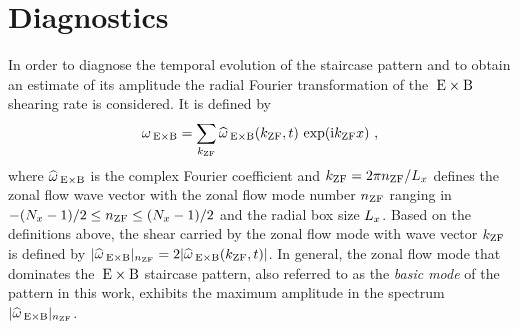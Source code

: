 \newpage
\section{Diagnostics}
\label{sec:diagnostics}

In order to diagnose the temporal evolution of the staircase pattern and to obtain an estimate of its amplitude the radial Fourier transformation of the $\mathrm{\:E}\times\mathrm{B}$ shearing rate is considered. 
It is defined by
\begin{equation}
	\omega_{\mathrm{\:E \times B}} = \sum_{k_\mathrm{ZF}} \widehat{\omega}_{\mathrm{\:E \times B}}(k_\mathrm{ZF},t) \, \exp(\mathrm{i} k_\mathrm{ZF} x)~,
	\label{eq:shearingrate_fourier}
\end{equation}
where $\widehat{\omega}_{\mathrm{\:E \times B}}$ is the complex Fourier coefficient and $k_\mathrm{ZF} = 2\pi n_\mathrm{ZF}/L_x$
defines the zonal flow wave vector with the zonal flow mode number $n_\mathrm{ZF}$ ranging in $-(N_x -1)/2 \leq n_\mathrm{ZF} \leq (N_x -1)/2 $ and the radial box size $L_x$.
Based on the definitions above, the shear carried by the zonal flow mode with wave vector $k_\mathrm{ZF}$ is defined by $|\widehat{\omega}_{\mathrm{\:E \times B}}|_{n_\mathrm{ZF}} = 2 |\widehat{\omega}_{\mathrm{\:E \times B}}(k_\mathrm{ZF},t)|$. 
In general, the zonal flow mode that dominates the $\mathrm{\:E}\times\mathrm{B}$ staircase pattern, also referred to as the \textit{basic mode} of the pattern in this work, exhibits the maximum amplitude in the spectrum $|\widehat{\omega}_{\mathrm{\:E \times B}}|_{n_\mathrm{ZF}}$.